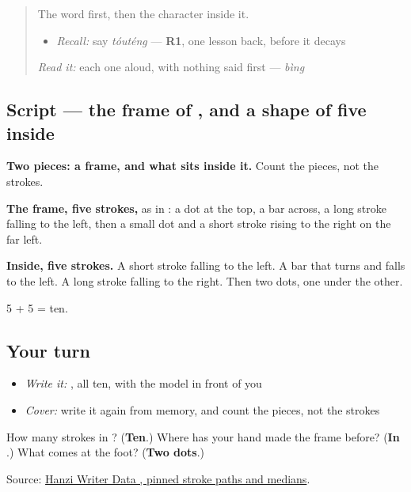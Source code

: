 \begin{quote}
The word first, then the character inside it.

\begin{itemize}
\raggedright
  \item \emph{Recall:} say \emph{tóuténg} — \textbf{R1}, one lesson back, before it decays
\end{itemize}

\begin{quote}
\end{quote}

\emph{Read it:} each one aloud, with nothing said first — \emph{bìng}
\end{quote}

\subsection*{Script — the frame of , and a shape of five inside}

\begin{quote}
\end{quote}

\textbf{Two pieces: a frame, and what sits inside it.} Count the pieces, not the strokes.

\textbf{The frame, five strokes,} as in : a dot at the top, a bar across, a long stroke falling to the left, then a small dot and a short stroke rising to the right on the far left.

\textbf{Inside, five strokes.} A short stroke falling to the left. A bar that turns and falls to the left. A long stroke falling to the right. Then two dots, one under the other.

5 + 5 = ten.

\subsection*{Your turn}
\begin{itemize}
\raggedright
  \item \emph{Write it:} , all ten, with the model in front of you
  \item \emph{Cover:} write it again from memory, and count the pieces, not the strokes
\end{itemize}

\begin{tcolorbox}[breakable,colback=teal!4,colframe=teal!35!black,title={Before you move on}]
How many strokes in ? (\textbf{Ten}.) Where has your hand made the frame before? (\textbf{In }.) What comes at the foot? (\textbf{Two dots}.)

Source: \href{https://raw.githubusercontent.com/chanind/hanzi-writer-data/68d10a4b21150cae5e1ebbd223eed289cf32d90c/data/\%E7\%96\%BC.json}{Hanzi Writer Data , pinned stroke paths and medians}.
\end{tcolorbox}
